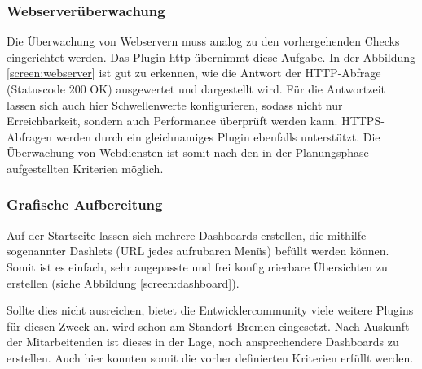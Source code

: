 \subsubsection{Webserverüberwachung}
\label{sec:ÜberwachungWebserver}
Die Überwachung von Webservern muss analog zu den vorhergehenden Checks eingerichtet werden. Das Plugin \glqq{}http\grqq{} übernimmt diese Aufgabe.  In der Abbildung \ref{screen:webserver} ist gut zu erkennen, wie die Antwort der HTTP-Abfrage (Statuscode 200 OK) ausgewertet und dargestellt wird. Für die Antwortzeit lassen sich auch hier Schwellenwerte konfigurieren, sodass nicht nur Erreichbarkeit, sondern auch Performance überprüft werden kann. HTTPS-Abfragen werden durch ein gleichnamiges Plugin ebenfalls unterstützt. Die Überwachung von Webdiensten ist somit nach den in der Planungsphase aufgestellten Kriterien möglich.

\subsubsection{Grafische Aufbereitung}
\label{sec:GrafischeAufbereitung}
Auf der Startseite lassen sich mehrere Dashboards erstellen, die mithilfe sogenannter \glqq{}Dashlets\grqq{} (URL jedes aufrubaren Menüs) befüllt werden können. Somit ist es einfach, sehr angepasste  und frei konfigurierbare Übersichten zu erstellen (siehe Abbildung \ref{screen:dashboard}).

Sollte dies nicht ausreichen, bietet die Entwicklercommunity viele weitere Plugins für diesen Zweck an.  wird schon am Standort Bremen eingesetzt. Nach Auskunft der Mitarbeitenden ist dieses in der Lage, noch ansprechendere Dashboards zu erstellen. Auch hier konnten somit die vorher definierten Kriterien erfüllt werden.